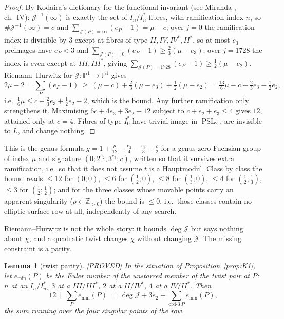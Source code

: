 \documentclass[11pt,reqno]{amsart}
\theoremstyle{plain}
\newtheorem{lemma}[theorem]{Lemma}
\theoremstyle{definition}
\theoremstyle{remark}
\theoremstyle{plain}
\newcommand{\Z}{\mathbb{Z}}
\newcommand{\PP}{\mathbb{P}}
\DeclareMathOperator{\PSL}{PSL}
\newcommand{\Proved}{\textup{\textsf{[PROVED]}}}
\begin{document}
\begin{proof}
By Kodaira's dictionary for the functional invariant (see Miranda
\cite{MirandaBook}, ch.~IV): $\mathcal J^{-1}(\infty)$ is exactly the set of
$I_n/I_n^*$ fibres, with ramification index $n$, so
$\#\mathcal J^{-1}(\infty)=c$ and $\sum_{\mathcal J(P)=\infty}(e_P-1)=\mu-c$;
over $j=0$ the ramification index is divisible by $3$ except at fibres of type
$II,IV,IV^*,II^*$, so at most $e_3$ preimages have $e_P<3$ and
$\sum_{\mathcal J(P)=0}(e_P-1)\ge\tfrac23(\mu-e_3)$; over $j=1728$ the index is
even except at $III,III^*$, giving
$\sum_{\mathcal J(P)=1728}(e_P-1)\ge\tfrac12(\mu-e_2)$. Riemann--Hurwitz for
$\mathcal J:\PP^1\to\PP^1$ gives
\[
2\mu-2=\sum_P(e_P-1)\ \ge\ (\mu-c)+\tfrac23(\mu-e_3)+\tfrac12(\mu-e_2)
=\tfrac{13}6\mu-c-\tfrac23e_3-\tfrac12e_2 ,
\]
i.e.\ $\tfrac16\mu\le c+\tfrac23e_3+\tfrac12e_2-2$, which is the bound. Any
further ramification only strengthens it. Maximising $6c+4e_3+3e_2-12$ subject to
$c+e_2+e_3\le4$ gives $12$, attained only at $c=4$. Fibres of type $I_0^*$ have
trivial image in $\PSL_2$, are invisible to $L$, and change nothing.
\end{proof}

This is the genus formula $g=1+\tfrac\mu{12}-\tfrac{e_2}4-\tfrac{e_3}3-\tfrac c2$
for a genus-zero Fuchsian group of index $\mu$ and signature
$(0;2^{e_2},3^{e_3};c)$, written so that it survives extra ramification, i.e.\ so
that it does not assume $t$ is a Hauptmodul. Class by class the bound reads
$\le12$ for $(0;0)$, $\le6$ for $(\tfrac12;0)$, $\le8$ for $(\tfrac13;0)$,
$\le4$ for $(\tfrac12;\tfrac13)$, $\le3$ for $(\tfrac12;\tfrac12)$; and for the
three classes whose movable points carry an apparent singularity
($\rho\in\Z_{>0}$) the bound is $\le0$, i.e.\ those classes contain no
elliptic-surface row at all, independently of any search.

Riemann--Hurwitz is not the whole story: it bounds $\deg\mathcal J$ but says
nothing about $\chi$, and a quadratic twist changes $\chi$ without changing
$\mathcal J$. The missing constraint is a parity.

\begin{lemma}[twist parity]\label{lem:twistparity}
\Proved{} In the situation of Proposition~\ref{prop:K1}, let $e_{\min}(P)$ be the
Euler number of the \emph{unstarred} member of the twist pair at $P$: $n$ at an
$I_n/I_n^*$, $3$ at a $III/III^*$, $2$ at a $II/IV^*$, $4$ at a $IV/II^*$. Then
\[
12\ \mid\ \sum_{P}e_{\min}(P)\ =\ \deg\mathcal J+3e_2+\!\!\sum_{\text{ord-}3\ P}\!\!e_{\min}(P),
\]
the sum running over the four singular points of the row.
\end{lemma}
\end{document}
